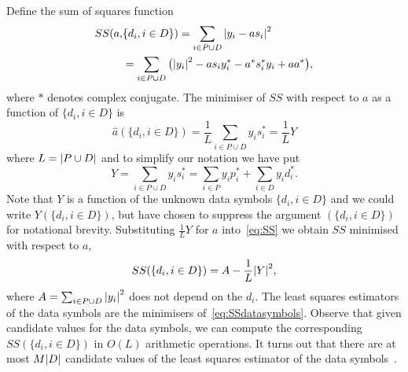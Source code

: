 \documentclass[draftcls, onecolumn, 11pt]{IEEEtran}
\begin{document}
Define the sum of squares function
\begin{align}
SS(a, &\{d_i, i \in D\}) = \sum_{i \in P \cup D} {\left\vert  y_i - a s_i  \right\vert}^2 \nonumber \\
&= \sum_{i \in P \cup D} \big( {\left\vert y_i \right\vert}^2 - a s_i y_i^* - a^* s_i^* y_i + aa^* \big), \label{eq:SS}
\end{align}
where $*$ denotes complex conjugate.  The minimiser of $SS$ with respect to $a$ as a function of $\{d_i, i \in D\}$ is
\begin{equation}\label{eq:hata}
\hat{a}(\{d_i, i \in D\}) = \frac{1}{L} \sum_{i \in P \cup D} y_i s_i^* = \frac{1}{L} Y
\end{equation}
where $L = {\left\vert P \cup D \right\vert}$ and to simplify our notation we have put 
\[
Y = \sum_{i \in P \cup D} y_i s_i^* = \sum_{i \in P } y_i p_i^* + \sum_{i \in D } y_i d_i^*.
\]  
Note that $Y$ is a function of the unknown data symbols $\{ d_i, i \in D\}$ and we could write $Y(\{ d_i, i \in D\})$, but have chosen to suppress the argument $(\{ d_i, i \in D\})$ for notational brevity.  Substituting $\frac{1}{L}Y$ for $a$ into~\eqref{eq:SS} we obtain $SS$ minimised with respect to $a$,
\begin{equation}\label{eq:SSdatasymbols}
SS(\{d_i, i \in D\}) = A - \frac{1}{L}{\left\vert Y \right\vert}^2,
\end{equation}
where $A = \sum_{i \in P \cup D}{\left\vert y_i \right\vert}^2$ does not depend on the $d_i$.  The least squares estimators of the data symbols are the minimisers of~\eqref{eq:SSdatasymbols}.  Observe that given candidate values for the data symbols, we can compute the corresponding $SS(\{d_i, i \in D\})$ in $O(L)$ arithmetic operations.  It turns out that there are at most $M{\left\vert D \right\vert}$ candidate values of the least squares estimator of the data symbols~\cite{Sweldens2001,Mackenthun1994}.  %
\end{document}
